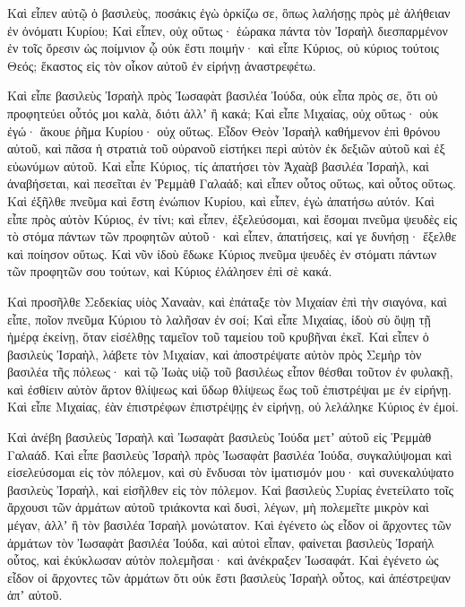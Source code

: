 {Καὶ εἶπεν αὐτῷ ὁ βασιλεὺς, ποσάκις ἐγὼ ὁρκίζω σε, ὃπως λαλήσῃς πρὸς μὲ ἀλήθειαν ἐν ὀνόματι Κυρίου;
Καὶ εἶπεν, οὐχ οὕτως· ἑώρακα πάντα τὸν Ἰσραὴλ διεσπαρμένον ἐν τοῖς ὄρεσιν ὡς ποίμνιον ᾧ οὐκ ἔστι ποιμήν· καὶ εἶπε Κύριος, οὐ κύριος τούτοις Θεός; ἕκαστος εἰς τὸν οἶκον αὐτοῦ ἐν εἰρήνῃ ἀναστρεφέτω.
\par }{\PP {}Καὶ εἶπε βασιλεὺς Ἰσραὴλ πρὸς Ἰωσαφὰτ βασιλέα Ἰούδα, οὐκ εἶπα πρὸς σε, ὅτι οὐ προφητεύει οὗτός μοι καλὰ, διότι ἀλλʼ ἢ κακά;
Καὶ εἶπε Μιχαίας, οὐχ οὕτως· οὐκ ἐγώ· ἄκουε ῥῆμα Κυρίου· οὐχ οὕτως. Εἶδον Θεὸν Ἰσραὴλ καθήμενον ἐπὶ θρόνου αὐτοῦ, καὶ πᾶσα ἡ στρατιὰ τοῦ οὐρανοῦ εἱστήκει περὶ αὐτὸν ἐκ δεξιῶν αὐτοῦ καὶ ἐξ εὐωνύμων αὐτοῦ.
Καὶ εἶπε Κύριος, τίς ἀπατήσει τὸν Ἀχαὰβ βασιλέα Ἰσραὴλ, καὶ ἀναβήσεται, καὶ πεσεῖται ἐν Ῥεμμὰθ Γαλαάδ; καὶ εἶπεν οὗτος οὕτως, καὶ οὗτος οὕτως.
Καὶ ἐξῆλθε πνεῦμα καὶ ἔστη ἐνώπιον Κυρίου, καὶ εἶπεν, ἐγὼ ἀπατήσω αὐτόν.
Καὶ εἶπε πρὸς αὐτὸν Κύριος, ἐν τίνι; καὶ εἶπεν, ἐξελεύσομαι, καὶ ἔσομαι πνεῦμα ψευδὲς εἰς τὸ στόμα πάντων τῶν προφητῶν αὐτοῦ· καὶ εἶπεν, ἀπατήσεις, καί γε δυνήσῃ· ἔξελθε καὶ ποίησον οὕτως.
Καὶ νῦν ἰδοὺ ἔδωκε Κύριος πνεῦμα ψευδὲς ἐν στόματι πάντων τῶν προφητῶν σου τούτων, καὶ Κύριος ἐλάλησεν ἐπὶ σὲ κακά.
\par }{\PP {}Καὶ προσῆλθε Σεδεκίας υἱὸς Χαναὰν, καὶ ἐπάταξε τὸν Μιχαίαν ἐπὶ τὴν σιαγόνα, καὶ εἶπε, ποῖον πνεῦμα Κύριου τὸ λαλῆσαν ἐν σοί;
Καὶ εἶπε Μιχαίας, ἰδοὺ σὺ ὄψῃ τῇ ἡμέρᾳ ἐκείνῃ, ὅταν εἰσέλθῃς ταμεῖον τοῦ ταμείου τοῦ κρυβῆναι ἐκεῖ.
Καὶ εἶπεν ὁ βασιλεὺς Ἰσραὴλ, λάβετε τὸν Μιχαίαν, καὶ ἀποστρέψατε αὐτὸν πρὸς Σεμὴρ τὸν βασιλέα τῆς πόλεως· καὶ τῷ Ἰωὰς υἱῷ τοῦ βασιλέως
εἶπον θέσθαι τοῦτον ἐν φυλακῇ, καὶ ἐσθίειν αὐτὸν ἄρτον θλίψεως καὶ ὕδωρ θλίψεως ἕως τοῦ ἐπιστρέψαι με ἐν εἰρήνῃ.
Καὶ εἶπε Μιχαίας, ἐὰν ἐπιστρέφων ἐπιστρέψῃς ἐν εἰρήνῃ, οὐ λελάληκε Κύριος ἐν ἐμοί.
\par }{\PP {}Καὶ ἀνέβη βασιλεὺς Ἰσραὴλ καὶ Ἰωσαφὰτ βασιλεὺς Ἰούδα μετʼ αὐτοῦ εἰς Ῥεμμὰθ Γαλαάδ.
Καὶ εἶπε βασιλεὺς Ἰσραὴλ πρὸς Ἰωσαφὰτ βασιλέα Ἰούδα, συγκαλύψομαι καὶ εἰσελεύσομαι εἰς τὸν πόλεμον, καὶ σὺ ἔνδυσαι τὸν ἱματισμόν μου· καὶ συνεκαλύψατο βασιλεὺς Ἰσραὴλ, καὶ εἰσῆλθεν εἰς τὸν πόλεμον.
Καὶ βασιλεὺς Συρίας ἐνετείλατο τοῖς ἄρχουσι τῶν ἁρμάτων αὐτοῦ τριάκοντα καὶ δυσὶ, λέγων, μὴ πολεμεῖτε μικρὸν καὶ μέγαν, ἀλλʼ ἢ τὸν βασιλέα Ἰσραὴλ μονώτατον.
Καὶ ἐγένετο ὡς εἶδον οἱ ἄρχοντες τῶν ἁρμάτων τὸν Ἰωσαφὰτ βασιλέα Ἰούδα, καὶ αὐτοὶ εἶπαν, φαίνεται βασιλεὺς Ἰσραήλ οὗτος, καὶ ἐκύκλωσαν αὐτὸν πολεμῆσαι· καὶ ἀνέκραξεν Ἰωσαφάτ.
Καὶ ἐγένετο ὡς εἶδον οἱ ἄρχοντες τῶν ἁρμάτων ὅτι οὐκ ἔστι βασιλεὺς Ἰσραὴλ οὗτος, καὶ ἀπέστρεψαν ἀπʼ αὐτοῦ.
}
